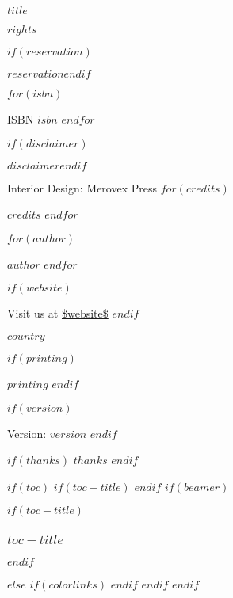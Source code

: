 \documentclass[$if(fontsize)$$fontsize$,$endif$$if(lang)$$babel-lang$,$endif$$if(papersize)$$papersize$paper,$endif$$if(beamer)$ignorenonframetext,$if(handout)$handout,$endif$$if(aspectratio)$aspectratio=$aspectratio$,$endif$$endif$$for(classoption)$$classoption$$sep$,$endfor$]{$documentclass$}
\begin{document}
  \vspace*{\fill}

  \par\noindent\emph{$title$}\newline
  \par\noindent\emph{$rights$}\newline

  \footnotesize
  $if(reservation)$\par\noindent $reservation$\newline$endif$

  $for(isbn)$
    \par\noindent ISBN $isbn$
  $endfor$\newline

  \footnotesize
  $if(disclaimer)$\par\noindent $disclaimer$\newline$endif$

  \par\noindent Interior Design: Merovex Press %
  $for(credits)$
    \par\noindent $credits$
  $endfor$\newline

  \par\noindent $for(author)$
      \par\noindent $author$
    $endfor$\newline

  $if(website)$
    \par\noindent Visit us at \url{$website$}\newline
  $endif$

  \par\noindent $country$
  \newline

  $if(printing)$
    \par\noindent\textit{$printing$}
    \newline
  $endif$

  $if(version)$
  \par\noindent Version: $version$
  $endif$
  \vspace*{\fill}
  \clearpage\normalsize

  $if(thanks)$
    $thanks$
    \newpage
  $endif$

  $if(toc)$
    $if(toc-title)$
      \renewcommand*\contentsname{$toc-title$}
    $endif$
    $if(beamer)$
      \begin{frame}
        $if(toc-title)$
        \frametitle{$toc-title$}
        $endif$
        \tableofcontents[hideallsubsections]
      \end{frame}
    $else$
    {
      $if(colorlinks)$
        \hypersetup{linkcolor=$if(toccolor)$$toccolor$$else$$endif$}
      $endif$
      \makeatletter
      \renewcommand*\l@section{\@dottedtocline{1}{1.5em}{3.0em}}
      \makeatother
      \setcounter{tocdepth}{$toc-depth$}
      \tableofcontents
    }
    $endif$
  $endif$
\end{document}
